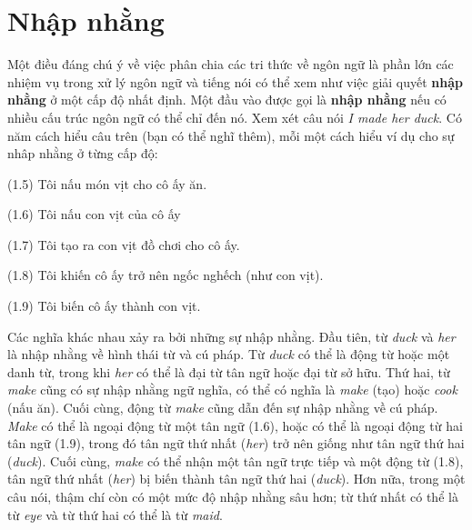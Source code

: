 \section{Nhập nhằng}

Một điều đáng chú ý về việc phân chia các tri thức về ngôn ngữ là phần lớn các nhiệm vụ trong xử lý ngôn ngữ và tiếng nói có thể xem như việc giải quyết \textbf{nhập nhằng} ở một cấp độ nhất định. Một đầu vào được gọi là \textbf{nhập nhằng} nếu có nhiều cấu trúc ngôn ngữ có thể chỉ đến nó. Xem xét câu nói \textit{I made her duck}. Có năm cách hiểu câu trên (bạn có thể nghĩ thêm), mỗi một cách hiểu ví dụ cho sự nhâp nhằng ở từng cấp độ:

\noindent
(1.5) Tôi nấu món vịt cho cô ấy ăn.

\noindent
(1.6) Tôi nấu con vịt của cô ấy

\noindent
(1.7) Tôi tạo ra con vịt đồ chơi cho cô ấy.

\noindent
(1.8) Tôi khiến cô ấy trở nên ngốc nghếch (như con vịt).

\noindent
(1.9) Tôi biến cô ấy thành con vịt.

Các nghĩa khác nhau xảy ra bởi những sự nhập nhằng. Đầu tiên, từ \textit{duck} và \textit{her} là nhập nhằng về hình thái từ và cú pháp. Từ \textit{duck} có thể là động từ hoặc một danh từ, trong khi \textit{her} có thể là đại từ tân ngữ hoặc đại từ sở hữu. Thứ hai, từ \textit{make} cũng có sự nhập nhằng ngữ nghĩa, có thể có nghĩa là \textit{make} (tạo) hoặc \textit{cook} (nấu ăn). Cuối cùng, động từ \textit{make} cũng dẫn đến sự nhập nhằng về cú pháp. \textit{Make} có thể là ngoại động từ một tân ngữ (1.6), hoặc có thể là ngoại động từ hai tân ngữ (1.9), trong đó tân ngữ thứ nhất (\textit{her}) trở nên giống như tân ngữ thứ hai (\textit{duck}). Cuối cùng, \textit{make} có thể nhận một tân ngữ trực tiếp và một động từ (1.8), tân ngữ thứ nhất (\textit{her}) bị biến thành tân ngữ thứ hai (\textit{duck}). Hơn nữa, trong một câu nói, thậm chí còn có một mức độ nhập nhằng sâu hơn; từ thứ nhất có thể là từ \textit{eye} và từ thứ hai có thể là từ \textit{maid}.

